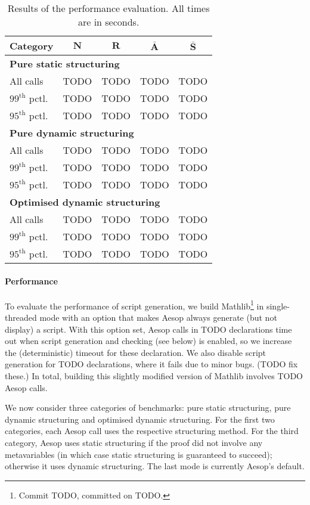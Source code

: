 \documentclass[sigplan,10pt,anonymous,review]{acmart}
\begin{document}
\begin{table}
  \centering
  \begin{tabular}{lcccc}
    \textbf{Category} & $\mathbf{N}$ & $\mathbf{R}$ & $\mathbf{\bar{A}}$ & $\mathbf{\bar{S}}$ \\
    \midrule
    \multicolumn{5}{l}{\textbf{Pure static structuring}} \\
    All calls               & TODO & TODO & TODO & TODO \\
    $99^{\mathrm{th}}$ pctl. & TODO & TODO & TODO & TODO \\
    $95^{\mathrm{th}}$ pctl. & TODO & TODO & TODO & TODO \\
    \midrule
    \multicolumn{5}{l}{\textbf{Pure dynamic structuring}} \\
    All calls               & TODO & TODO & TODO & TODO \\
    $99^{\mathrm{th}}$ pctl. & TODO & TODO & TODO & TODO \\
    $95^{\mathrm{th}}$ pctl. & TODO & TODO & TODO & TODO \\
    \midrule
    \multicolumn{5}{l}{\textbf{Optimised dynamic structuring}} \\
    All calls               & TODO & TODO & TODO & TODO \\
    $99^{\mathrm{th}}$ pctl. & TODO & TODO & TODO & TODO \\
    $95^{\mathrm{th}}$ pctl. & TODO & TODO & TODO & TODO \\
  \end{tabular}
  \medskip
  \caption{Results of the performance evaluation. All times are in seconds.}%
  \label{table:evaluation}
\end{table}

\paragraph{Performance}
To evaluate the performance of script generation, we build Mathlib\footnote{Commit TODO, committed on TODO.} in single-threaded mode with an option that makes Aesop always generate (but not display) a script.
With this option set, Aesop calls in TODO declarations time out when script generation and checking (see below) is enabled, so we increase the (deterministic) timeout for these declaration.
We also disable script generation for TODO declarations, where it fails due to minor bugs. (TODO fix these.)
In total, building this slightly modified version of Mathlib involves TODO Aesop calls.

We now consider three categories of benchmarks: pure static structuring, pure dynamic structuring and optimised dynamic structuring.
For the first two categories, each Aesop call uses the respective structuring method.
For the third category, Aesop uses static structuring if the proof did not involve any metavariables (in which case static structuring is guaranteed to succeed); otherwise it uses dynamic structuring.
The last mode is currently Aesop's default.
\end{document}
